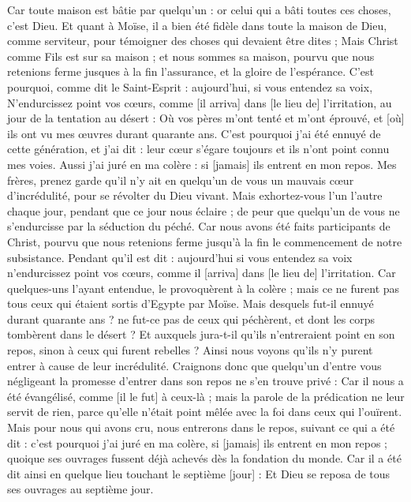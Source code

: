 \begin{multicols}{2}
Car toute maison est bâtie par quelqu'un : or celui qui a bâti toutes ces choses, c'est Dieu.
Et quant à Moïse, il a bien été fidèle dans toute la maison de Dieu, comme serviteur, pour témoigner des choses qui devaient être dites ;
Mais Christ comme Fils est sur sa maison ; et nous sommes sa maison, pourvu que nous retenions ferme jusques à la fin l'assurance, et la gloire de l'espérance.
C'est pourquoi, comme dit le Saint-Esprit : aujourd'hui, si vous entendez sa voix,
N'endurcissez point vos cœurs, comme [il arriva] dans [le lieu de] l'irritation, au jour de la tentation au désert :
Où vos pères m'ont tenté et m'ont éprouvé, et [où] ils ont vu mes œuvres durant quarante ans.
C'est pourquoi j'ai été ennuyé de cette génération, et j'ai dit : leur cœur s'égare toujours et ils n'ont point connu mes voies.
Aussi j'ai juré en ma colère : si [jamais] ils entrent en mon repos.
Mes frères, prenez garde qu'il n'y ait en quelqu'un de vous un mauvais cœur d'incrédulité, pour se révolter du Dieu vivant.
Mais exhortez-vous l'un l'autre chaque jour, pendant que ce jour nous éclaire ; de peur que quelqu'un de vous ne s'endurcisse par la séduction du péché.
Car nous avons été faits participants de Christ, pourvu que nous retenions ferme jusqu'à la fin le commencement de notre subsistance.
Pendant qu'il est dit : aujourd'hui si vous entendez sa voix n'endurcissez point vos cœurs, comme il [arriva] dans [le lieu de] l'irritation.
Car quelques-uns l'ayant entendue, le provoquèrent à la colère ; mais ce ne furent pas tous ceux qui étaient sortis d'Egypte par Moïse.
Mais desquels fut-il ennuyé durant quarante ans ? ne fut-ce pas de ceux qui péchèrent, et dont les corps tombèrent dans le désert ?
Et auxquels jura-t-il qu'ils n'entreraient point en son repos, sinon à ceux qui furent rebelles ?
Ainsi nous voyons qu'ils n'y purent entrer à cause de leur incrédulité.
\VerseOne{}Craignons donc que quelqu'un d'entre vous négligeant la promesse d'entrer dans son repos ne s'en trouve privé :
Car il nous a été évangélisé, comme [il le fut] à ceux-là ; mais la parole de la prédication ne leur servit de rien, parce qu'elle n'était point mêlée avec la foi dans ceux qui l'ouïrent.
Mais pour nous qui avons cru, nous entrerons dans le repos, suivant ce qui a été dit : c'est pourquoi j'ai juré en ma colère, si [jamais] ils entrent en mon repos ; quoique ses ouvrages fussent déjà achevés dès la fondation du monde.
Car il a été dit ainsi en quelque lieu touchant le septième [jour] : Et Dieu se reposa de tous ses ouvrages au septième jour.

\end{multicols}
